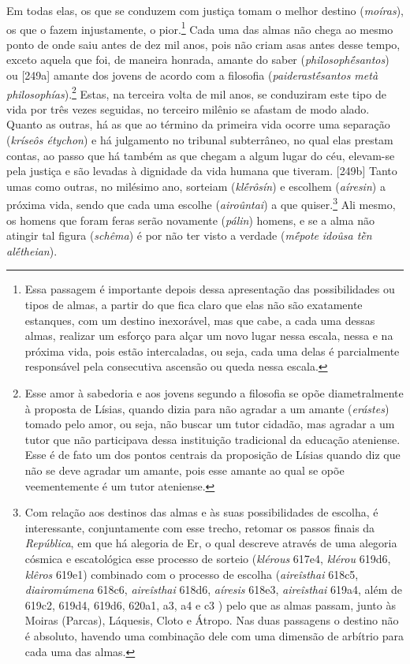 Em todas elas, os que se conduzem com justiça tomam o melhor destino
(\emph{moíras}), os que o fazem injustamente, o pior.\footnote{Essa
  passagem é importante depois dessa apresentação das possibilidades ou
  tipos de almas, a partir do que fica claro que elas não são exatamente
  estanques, com um destino inexorável, mas que cabe, a cada uma dessas
  almas, realizar um esforço para alçar um novo lugar nessa escala,
  nessa e na próxima vida, pois estão intercaladas, ou seja, cada uma
  delas é parcialmente responsável pela consecutiva ascensão ou queda
  nessa escala.} Cada uma das almas não chega ao mesmo ponto de onde
saiu antes de dez mil anos, pois não criam asas antes desse tempo,
exceto aquela que foi, de maneira honrada, amante do saber
(\emph{philosophḗsantos}) ou {[}249a{]} amante dos jovens de acordo com
a filosofia (\emph{paiderastḗsantos metà philosophías}).\footnote{Esse
  amor à sabedoria e aos jovens segundo a filosofia se opõe
  diametralmente à proposta de Lísias, quando dizia para não agradar a
  um amante (\emph{erástes}) tomado pelo amor, ou seja, não buscar um
  tutor cidadão, mas agradar a um tutor que não participava dessa
  instituição tradicional da educação ateniense. Esse é de fato um dos
  pontos centrais da proposição de Lísias quando diz que não se deve
  agradar um amante, pois esse amante ao qual se opõe veementemente é um
  tutor ateniense.} Estas, na terceira volta de mil anos, se conduziram
este tipo de vida por três vezes seguidas, no terceiro milênio se
afastam de modo alado. Quanto as outras, há as que ao término da
primeira vida ocorre uma separação (\emph{kríseôs étychon}) e há
julgamento no tribunal subterrâneo, no qual elas prestam contas, ao
passo que há também as que chegam a algum lugar do céu, elevam-se pela
justiça e são levadas à dignidade da vida humana que tiveram. {[}249b{]}
Tanto umas como outras, no milésimo ano, sorteiam (\emph{klḗrôsín}) e
escolhem (\emph{aíresin}) a próxima vida, sendo que cada uma escolhe
(\emph{airoûntai}) a que quiser.\footnote{Com relação aos destinos das
  almas e às suas possibilidades de escolha, é interessante,
  conjuntamente com esse trecho, retomar os passos finais da
  \emph{República}, em que há alegoria de Er, o qual descreve através de
  uma alegoria cósmica e escatológica esse processo de sorteio
  (\emph{klérous} 617e4, \emph{klérou} 619d6, \emph{klêros} 619e1)
  combinado com o processo de escolha (\emph{aireîsthai} 618c5,
  \emph{diairomúmena} 618c6, \emph{aireîsthai} 618d6, \emph{aíresis}
  618e3, \emph{aireîsthai} 619a4, além de 619c2, 619d4, 619d6, 620a1,
  a3, a4 e c3 ) pelo que as almas passam, junto às Moiras (Parcas),
  Láquesis, Cloto e Átropo. Nas duas passagens o destino não é absoluto,
  havendo uma combinação dele com uma dimensão de arbítrio para cada uma
  das almas.} Ali mesmo, os homens que foram feras serão novamente
(\emph{pálin}) homens, e se a alma não atingir tal figura
(\emph{schêma}) é por não ter visto a verdade (\emph{mḗpote}
\emph{idoûsa tḕn alḗtheian}).

